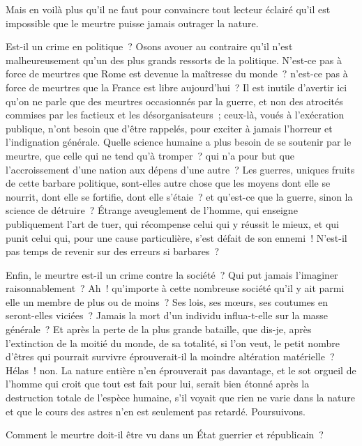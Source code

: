 \documentclass[french,twoside]{book} %
\begin{document}
Mais en voilà plus qu’il ne faut pour convaincre tout lecteur éclairé qu’il est impossible que le meurtre puisse jamais outrager la nature.\par
Est-il un crime en politique ? Osons avouer au contraire qu’il n’est malheureusement qu’un des plus grands ressorts de la politique. N’est-ce pas à force de meurtres que Rome est devenue la maîtresse du monde ? n’est-ce pas à force de meurtres que la France est libre aujourd’hui ? Il est inutile d’avertir ici qu’on ne parle que des meurtres occasionnés par la guerre, et non des atrocités commises par les factieux et les désorganisateurs ; ceux-là, voués à l’exécration publique, n’ont besoin que d’être rappelés, pour exciter à jamais l’horreur et l’indignation générale. Quelle science humaine a plus besoin de se soutenir par le meurtre, que celle qui ne tend qu’à tromper ? qui n’a pour but que l’accroissement d’une nation aux dépens d’une autre ? Les guerres, uniques fruits de cette barbare politique, sont-elles autre chose que les moyens dont elle se nourrit, dont elle se fortifie, dont elle s’étaie ? et qu’est-ce que la guerre, sinon la science de détruire ? Étrange aveuglement de l’homme, qui enseigne publiquement l’art de tuer, qui récompense celui qui y réussit le mieux, et qui punit celui qui, pour une cause particulière, s’est défait de son ennemi ! N’est-il pas temps de revenir sur des erreurs si barbares ?\par
Enfin, le meurtre est-il un crime contre la société ? Qui put jamais l’imaginer raisonnablement ? Ah ! qu’importe à cette nombreuse société qu’il y ait parmi elle un membre de plus ou de moins ? Ses lois, ses mœurs, ses coutumes en seront-elles viciées ? Jamais la mort d’un individu influa-t-elle sur la masse générale ? Et après la perte de la plus grande bataille, que dis-je, après l’extinction de la moitié du monde, de sa totalité, si l’on veut, le petit nombre d’êtres qui pourrait survivre éprouverait-il la moindre altération matérielle ? Hélas ! non. La nature entière n’en éprouverait pas davantage, et le sot orgueil de l’homme qui croit que tout est fait pour lui, serait bien étonné après la destruction totale de l’espèce humaine, s’il voyait que rien ne varie dans la nature et que le cours des astres n’en est seulement pas retardé. Poursuivons.\par
Comment le meurtre doit-il être vu dans un État guerrier et républicain ?\par
\end{document}
